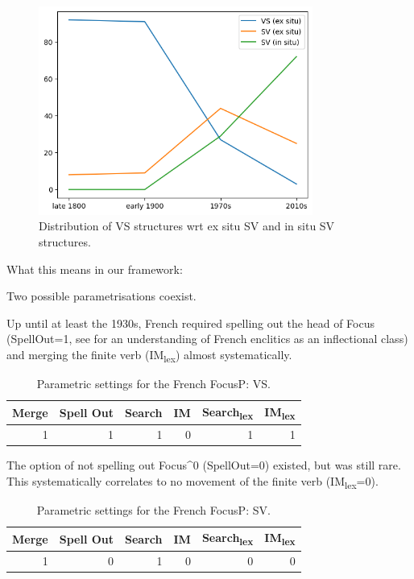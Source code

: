 \documentclass[fleqn,10pt]{wlscirep}
\begin{document}
  \begin{figure}[H]
    \centering
    \includegraphics[width=90mm]{images/exsituinsitu.png}
    \caption{Distribution of VS structures wrt ex situ SV and in situ SV structures.}
    \label{fig:boat2}
  \end{figure}

  \noindent What this means in our framework:

  \noindent Two possible parametrisations coexist.
  
  \noindent Up until at least the 1930s, French required spelling out the head of Focus (SpellOut=1, see \citealt{roberts2017} for an understanding of French enclitics as an inflectional class) and merging the finite verb (IM\textsubscript{lex}) almost systematically.

    \begin{table}[H]
        \centering
        \begin{tabular}{|r|r|r|r|r|r|}
        \hline
        Merge & Spell Out & Search & IM & Search\textsubscript{lex} & IM\textsubscript{lex} \\
        \hline
        1 & 1 & 1 & 0 & 1 & 1 \\
        \hline
        \end{tabular}
        \caption{\label{tab:samp}Parametric settings for the French FocusP: VS.}
    \end{table}

\noindent The option of not spelling out Focus^0 (SpellOut=0) existed, but was still rare. This systematically correlates to no movement of the finite verb (IM\textsubscript{lex}=0).

\begin{table}[H]
    \centering
    \begin{tabular}{|r|r|r|r|r|r|}
    \hline
    Merge & Spell Out & Search & IM & Search\textsubscript{lex} & IM\textsubscript{lex} \\
    \hline
    1 & 0 & 1 & 0 & 0 & 0 \\
    \hline
    \end{tabular}
    \caption{\label{tab:samp}Parametric settings for the French FocusP: SV.}
\end{table}
\end{document}
